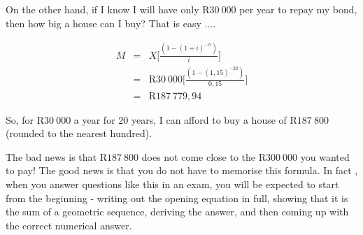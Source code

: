 On the other hand, if I know I will have only R$30~000$ per year to repay my bond, then how big a house can I buy? That is easy ....

\begin{eqnarray*}
M &=& X \biggl[\frac{(1-(1+i)^{-n})}{i}\biggr]\\
&=& \mbox{R}30~000 \biggl[\frac{(1-(1,15)^{-20})}{0,15}\biggr]\\
&=& \mbox{R}187~779,94
\end{eqnarray*}

So, for R$30~000$ a year for 20 years, I can afford to buy a house of R$187~800$ (rounded to the nearest hundred).

The bad news is that R$187~800$ does not come close to the R$300~000$ you wanted to pay! The good news is that you do not have to memorise this formula. In fact , when you answer questions like this in an exam, you will be expected to start from the beginning - writing out the opening equation in full, showing that it is the sum of a geometric sequence, deriving the answer, and then coming up with the correct numerical answer.

